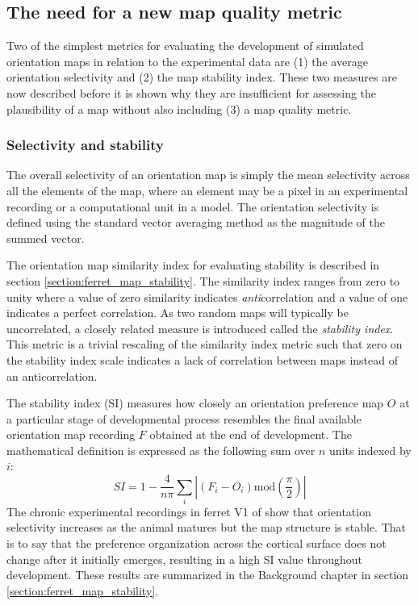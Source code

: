 \documentclass[phd,ianc,twoside]{infthesis}
\begin{document}
\subsection{The need for a new map quality metric}

Two of the simplest metrics for evaluating the development of simulated
orientation maps in relation to the experimental data are (1) the
average orientation selectivity and (2) the map stability index. These
two measures are now described before it is shown why they are
insufficient for assessing the plausibility of a map without also
including (3) a map quality metric.

\subsubsection*{Selectivity and stability}


The overall selectivity of an orientation map is simply the mean
selectivity across all the elements of the map, where an element may be
a pixel in an experimental recording or a computational unit in a model.
The orientation selectivity is defined using the standard vector
averaging method \citep{miikkulainen_2005,blasdel_nature86} as the
magnitude of the summed vector.

The orientation map similarity index for evaluating stability is
described in section \ref{section:ferret_map_stability}. The similarity
index ranges from zero to unity where a value of zero similarity
indicates \emph{anti}correlation and a value of one indicates a perfect
correlation. As two random maps will typically be uncorrelated, a
closely related measure is introduced called the \emph{stability index}.
This metric is a trivial rescaling of the similarity index metric such
that zero on the stability index scale indicates a lack of correlation
between maps instead of an anticorrelation.

The stability index (SI) measures how closely an orientation preference
map $O$ at a particular stage of developmental process resembles the
final available orientation map recording $F$ obtained at the end of
development. The mathematical definition is expressed as the following
sum over $n$ units indexed by $i$:
\begin{equation}
  SI = 1 - \frac{4}{n \pi} \sum_{i} \left| (F_i - O_i) \mathrm{mod}
  \left( \frac{\pi}{2} \right)\right|
\end{equation}
The chronic experimental recordings in ferret V1 of \citet{chapman_jn96}
show that orientation selectivity increases as the animal matures but
the map structure is stable. That is to say that the preference
organization across the cortical surface does not change after it
initially emerges, resulting in a high SI value throughout
development. These results are summarized in the Background chapter in
section \ref{section:ferret_map_stability}.
\end{document}
